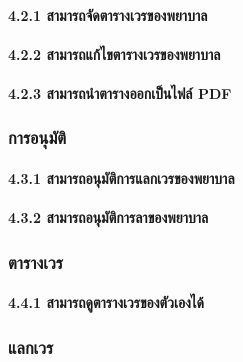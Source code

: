 \hspace{2.5cm}\paragraph{4.2.1 สามารถจัดตารางเวรของพยาบาล}

\hspace{2.5cm}\paragraph{4.2.2 สามารถแก้ไขตารางเวรของพยาบาล}

\hspace{2.5cm}\paragraph{4.2.3 สามารถนำตารางออกเป็นไฟล์ PDF}

\hspace{1cm}\subsubsection{การอนุมัติ}

\hspace{2.5cm}\paragraph{4.3.1 สามารถอนุมัติการแลกเวรของพยาบาล}

\hspace{2.5cm}\paragraph{4.3.2 สามารถอนุมัติการลาของพยาบาล}

\hspace{1cm}\subsubsection{ตารางเวร}

\hspace{2.5cm}\paragraph{4.4.1 สามารถดูตารางเวรของตัวเองได้}

\hspace{1cm}\subsubsection{แลกเวร}

